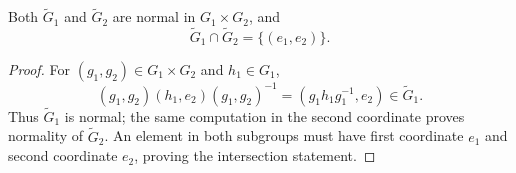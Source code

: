 \documentclass[reqno,11pt]{amsart}
\begin{document}
\begin{lemma}
Both $\widetilde G_1$ and $\widetilde G_2$ are normal in
$G_1\times G_2$, and
\[
  \widetilde G_1\cap\widetilde G_2=\{(e_1,e_2)\}.
\]
\end{lemma}
\begin{proof}
For $(g_1,g_2)\in G_1\times G_2$ and $h_1\in G_1$,
\[
  (g_1,g_2)(h_1,e_2)(g_1,g_2)^{-1}
  =(g_1h_1g_1^{-1},e_2)\in\widetilde G_1.
\]
Thus $\widetilde G_1$ is normal; the same computation in the second
coordinate proves normality of $\widetilde G_2$.
An element in both subgroups must have first coordinate $e_1$ and
second coordinate $e_2$, proving the intersection statement.
\end{proof}
\end{document}
